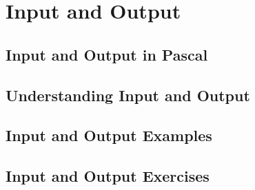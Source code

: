 \chapter{Input and Output} %
\label{cha:input_and_output}

\minitoc








\clearpage
\section{Input and Output in Pascal} %
\def\pageLang{pas}
\label{sec:file_io_in_pascal}


\clearpage
\def\pageLang{none}
\section{Understanding Input and Output} %
\label{sec:understanding_input_and_output}


\clearpage
\section{Input and Output Examples} %
\label{sec:input_and_output_examples}


\clearpage
\section{Input and Output Exercises} %
\label{sec:input_and_output_exercises}


